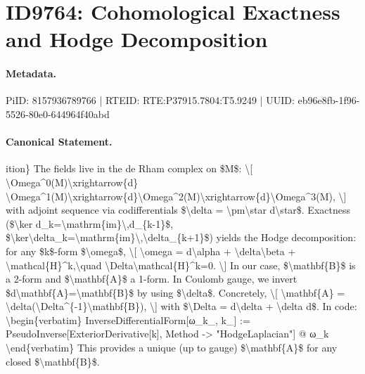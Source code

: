 \section*{ID9764: Cohomological Exactness and Hodge Decomposition}
\paragraph{Metadata.}
PiID: 8157936789766 | RTEID: RTE:P37915.7804:T5.9249 | UUID: eb96e8fb-1f96-5526-80e0-644964f40abd

\paragraph{Canonical Statement.}
ition\} The fields live in the de Rham complex on \$M\$: \textbackslash{}[ \textbackslash{}Omega\textasciicircum{}0(M)\textbackslash{}xrightarrow\{d\} \textbackslash{}Omega\textasciicircum{}1(M)\textbackslash{}xrightarrow\{d\}\textbackslash{}Omega\textasciicircum{}2(M)\textbackslash{}xrightarrow\{d\}\textbackslash{}Omega\textasciicircum{}3(M), \textbackslash{}] with adjoint sequence via codifferentials \$\textbackslash{}delta = \textbackslash{}pm\textbackslash{}star d\textbackslash{}star\$. Exactness (\$\textbackslash{}ker d\_k=\textbackslash{}mathrm\{im\}\textbackslash{},d\_\{k-1\}\$, \$\textbackslash{}ker\textbackslash{}delta\_k=\textbackslash{}mathrm\{im\}\textbackslash{},\textbackslash{}delta\_\{k+1\}\$) yields the Hodge decomposition: for any \$k\$-form \$\textbackslash{}omega\$, \textbackslash{}[ \textbackslash{}omega = d\textbackslash{}alpha + \textbackslash{}delta\textbackslash{}beta + \textbackslash{}mathcal\{H\}\textasciicircum{}k,\textbackslash{}quad \textbackslash{}Delta\textbackslash{}mathcal\{H\}\textasciicircum{}k=0. \textbackslash{}] In our case, \$\textbackslash{}mathbf\{B\}\$ is a 2-form and \$\textbackslash{}mathbf\{A\}\$ a 1-form. In Coulomb gauge, we invert \$d\textbackslash{}mathbf\{A\}=\textbackslash{}mathbf\{B\}\$ by using \$\textbackslash{}delta\$. Concretely, \textbackslash{}[ \textbackslash{}mathbf\{A\} = \textbackslash{}delta(\textbackslash{}Delta\textasciicircum{}\{-1\}\textbackslash{}mathbf\{B\}), \textbackslash{}] with \$\textbackslash{}Delta = d\textbackslash{}delta + \textbackslash{}delta d\$. In code: \textbackslash{}begin\{verbatim\} InverseDifferentialForm[ω\_k\_, k\_] := PseudoInverse[ExteriorDerivative[k], Method -> "HodgeLaplacian"] @ ω\_k \textbackslash{}end\{verbatim\} This provides a unique (up to gauge) \$\textbackslash{}mathbf\{A\}\$ for any closed \$\textbackslash{}mathbf\{B\}\$.

